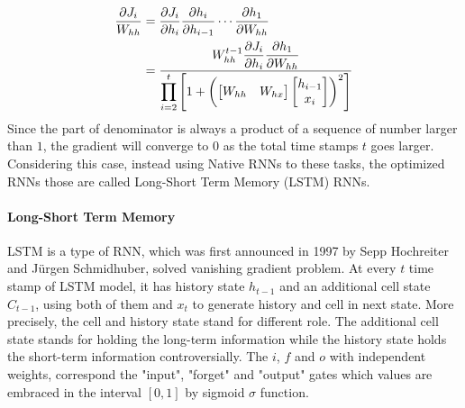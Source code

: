 \begin{multicols}{2}
\begin{align*}
    \frac{
        \partial
        J_i
        }{W_{hh}}
    & =
    \frac{
        \partial J_i
    }{\partial h_i}
    \frac{
        \partial h_{i}
    }{\partial h_{i-1}}
    \cdots
    \frac{
        \partial h_1
    }{\partial W_{hh}}\\
    &
    = 
    \frac{
        \dis 
        W_{hh}^{t-1} 
        \frac{
            \partial J_i
        }{\partial h_i}
        \frac{
            \partial h_1
        }{\partial W_{hh}}
    }{
        \dis 
        \prod_{i=2}^{t}
        \left[1
        +
        \left(\begin{bmatrix}
            W_{hh} & W_{hx} \\
        \end{bmatrix}
        \begin{bmatrix}
            h_{i-1} \\ x_i \\
        \end{bmatrix}
        \right)^2
        \right]}
\end{align*}
Since the part of denominator is always a product of 
a sequence of number larger than $1$, the gradient 
will converge to $0$ as the total time stamps $t$ goes larger.
Considering this case, instead using Native RNNs to these tasks, the optimized RNNs those 
are called Long-Short Term Memory (LSTM) RNNs. 

\paragraph{Long-Short Term Memory} 
LSTM \cite{article} is a type of RNN, which was first announced in 1997 
by Sepp Hochreiter and Jürgen Schmidhuber,
solved vanishing gradient problem. 
At every $t$ time stamp of LSTM model, it has history state $h_{t-1}$ and 
an additional cell state $C_{t-1}$, using both of them and $x_t$ to 
generate history and cell in next state. 
More precisely, the cell and history state stand for different role.
The additional cell state stands for holding the long-term information while the 
history state holds the short-term information controversially. 
The $i$, $f$ and $o$ with independent weights,
correspond the "input", "forget" and "output" 
gates which values are embraced in the interval $[0,1]$ by sigmoid $\sigma$ function. 

\begin{figure}[H]
    \centering
    \begin{tikzpicture}[
        gate/.style={rectangle, draw, fill=orange!30, minimum size=10mm},
        operator/.style={circle, draw, fill=blue!30, minimum size=10mm},
        function/.style={ellipse, draw, fill=green!30, minimum size=10mm},
        pathline/.style={-latex'},
        scale=0.7, transform shape, every node/.style={scale=0.8, font=\Large}
    ]


\end{tikzpicture}
\end{figure}
\end{multicols}
